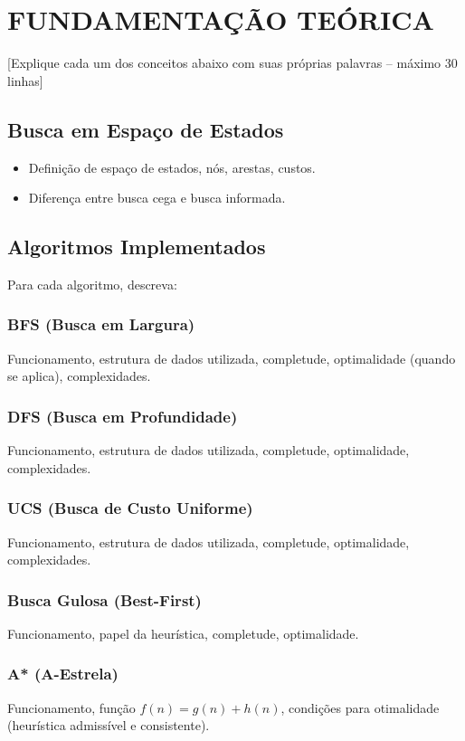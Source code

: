 \documentclass[12pt,a4paper]{article}
\begin{document}
\section{FUNDAMENTAÇÃO TEÓRICA}

[Explique cada um dos conceitos abaixo com suas próprias palavras – máximo 30 linhas]

\subsection{Busca em Espaço de Estados}
\begin{itemize}
    \item Definição de espaço de estados, nós, arestas, custos.
    \item Diferença entre busca cega e busca informada.
\end{itemize}

\subsection{Algoritmos Implementados}
Para cada algoritmo, descreva:

\subsubsection{BFS (Busca em Largura)}
Funcionamento, estrutura de dados utilizada, completude, optimalidade (quando se aplica), complexidades.

\subsubsection{DFS (Busca em Profundidade)}
Funcionamento, estrutura de dados utilizada, completude, optimalidade, complexidades.

\subsubsection{UCS (Busca de Custo Uniforme)}
Funcionamento, estrutura de dados utilizada, completude, optimalidade, complexidades.

\subsubsection{Busca Gulosa (Best-First)}
Funcionamento, papel da heurística, completude, optimalidade.

\subsubsection{A* (A-Estrela)}
Funcionamento, função \( f(n) = g(n) + h(n) \), condições para otimalidade (heurística admissível e consistente).
\end{document}
